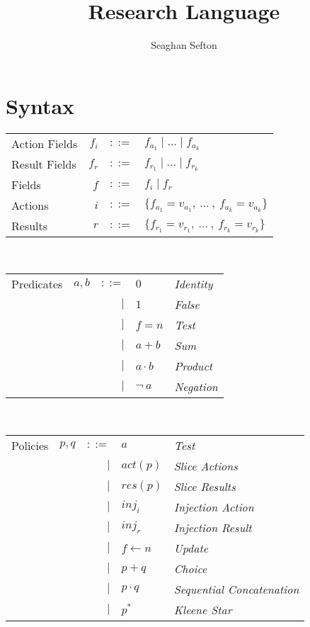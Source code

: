 \documentclass[12pt, letterpaper]{article}
\title{Research Language}
\author{Seaghan Sefton}
\begin{document}
\section*{Syntax}


	\begin{tabular}{l r c l}
		Action Fields	& $f_{i}$ 	& $::=$		& $f_{a_{1}} \mid \dots \mid f_{a_{k}}$\\
		Result Fields 	& $f_{r}$ 	& $::=$		& $f_{r_{1}} \mid \dots \mid f_{r_{k}}$\\
		Fields 	        & $f$ 	        & $::=$         & $f_i \mid f_r$ \\
		Actions			& $i$ 	& $::=$ 	& $\{f_{a_{1}} = v_{a_{1}} ,\ \dots\ ,\ f_{a_{k}} = v_{a_{k}}\}$\\
		Results			& $r$ 	& $::=$ 	& $\{f_{r_{1}} = v_{r_{1}} ,\ \dots\ ,\ f_{r_{k}} = v_{r_{k}}\}$\\
	\end{tabular}\\
	\begin{tabular}{l c r l l}
		Predicates 	& $a,b$	 	& $::=$  & $0$ 			& \textit{Identity}	\\
					& 			& $\mid$ & $1$ 			& \textit{False}	\\
					&			& $\mid$ & $f=n$			& \textit{Test}	\\	
					& 			& $\mid$ & $a + b$ 		& \textit{Sum}		\\
					& 			& $\mid$ & $a \cdot b$ 	& \textit{Product}	\\
					&			& $\mid$ & $\neg \ a$		& \textit{Negation}
	\end{tabular}\\
	\begin{tabular}{l c r l l}
		Policies 	& $p,q$ 	& $::=$  & $a$ 				& \textit{Test}		\\
					& 			& $\mid$ & $act(p)$ 			& \textit{Slice Actions}	\\
					& 			& $\mid$ & $res(p)$ 			& \textit{Slice Results}	\\
					& 			& $\mid$ & $inj_{i}$ 			& \textit{Injection Action}	\\
					& 			& $\mid$ & $inj_{r}$ 			& \textit{Injection Result}	\\
					&			& $\mid$ & $f \leftarrow n$		& \textit{Update}	\\
					&			& $\mid$ & $p + q$			& \textit{Choice}	\\
					&			& $\mid$ & $p \cdot q$		& \textit{Sequential Concatenation}	\\
					&			& $\mid$ & $p ^{*}$			& \textit{Kleene Star}
	\end{tabular}\\
\end{document}

